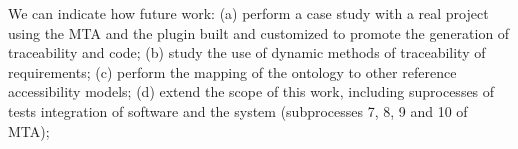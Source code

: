 \documentclass[10pt, conference, compsocconf]{IEEEtran}
\begin{document}
We can indicate how future work: (a) perform a case study with a real project using the MTA and the plugin
   built and customized to promote the generation of traceability and code; (b) study the use of dynamic methods of
   traceability of requirements; (c) perform the mapping of the ontology to other reference
   accessibility models; (d) extend the scope of this work, including suprocesses of tests
   integration of software and the system (subprocesses 7, 8, 9 and 10 of
   MTA);






%






\end{document}
